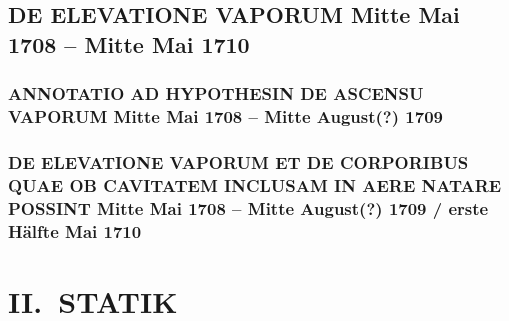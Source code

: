 \documentclass[%
fontsize=10pt,
]{scrbook}
\DeclareRobustCommand{\bracks}[1]{%
\textup{\lbrack}#1\textup{\rbrack}}
\begin{document}
\chapter[tocentry={De elevatione vaporum
\enskip%
\bracks{Mitte Mai 1708 --
Mitte Mai 1710%
}},
head={De elevatione vaporum}]%
{\MakeUppercase{De elevatione vaporum}
\newline%
\bracks{Mitte Mai 1708 --
Mitte Mai 1710%
}}
\label{elevaporum_intro}



\section[tocentry={Annotatio ad hypothesin de ascensu vaporum
\enskip%
\bracks{Mitte Mai 1708 --
Mitte August\;(?) 1709%
}},
head={Annotatio ad hypothesin de ascensu vaporum%
}]%
{\MakeUppercase{Annotatio ad hypothesin de ascensu vaporum}
\newline%
\bracks{Mitte Mai 1708 --
Mitte August\;(?) 1709%
}}
\label{60210}



\section[tocentry={De elevatione vaporum et de corporibus quae ob cavitatem inclusam in aere natare possint
\enskip%
\bracks{Mitte Mai 1708 --
Mitte August\;(?) 1709 / erste Hälfte Mai 1710%
}},
head={De elevatione vaporum%
}]%
{\MakeUppercase{De elevatione vaporum et de corporibus quae ob cavitatem inclusam in aere natare possint}
\newline%
\bracks{Mitte Mai 1708 --
Mitte August\;(?) 1709 / erste Hälfte Mai 1710%
}}
\label{37109+60209}
























\part{II.~STATIK} 
\end{document}
